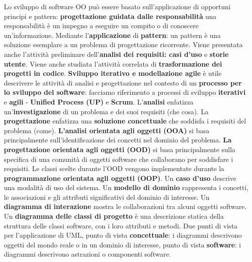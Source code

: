 \documentclass{article}
\numberwithin{equation}{subsection}
\begin{document}
Lo sviluppo di software OO può essere basato sull'applicazione di opportuni principi e pattern: \textbf{progettazione guidata dalle responsabilità} una responsabilità è un impegno a eseguire un compito o di conoscere un'informazione. Mediante l'\textbf{applicazione} di \textbf{pattern}: un pattern è una soluzione esemplare a un problema di progettazione ricorrente. Viene presentata anche l'attività preliminare dell'\textbf{analisi dei requisiti: casi d'uso} e \textbf{storie utente}. Viene anche studiata l'attività correlata di \textbf{trasformazione dei progetti in codice}. \textbf{Sviluppo iterativo e modellazione agile} è utile descrivere le attività di analisi e progettazione nel contesto di un \textbf{processo per lo sviluppo del software}: facciamo riferimento a processi di sviluppo \textbf{iterativi} e \textbf{agili} - \textbf{Unified Process (UP)} e \textbf{Scrum}. L'\textbf{analisi} enfatizza un'\textbf{investigazione} di un problema e dei suoi requisiti (che cosa). La \textbf{progettazione} enfatizza una \textbf{soluzione concettuale} che soddisfa i requisiti del problema (come). \textbf{L'analisi orientata agli oggetti (OOA)} si basa principalmente sull'identificazione dei concetti nel dominio del problema. \textbf{La progettazione orientata agli oggetti (OOD)} si basa principalmente sulla specifica di una comunità  di oggetti software che collaborano per soddisfare i requisiti. Le classi scelte durante l'OOD vengono implementate durante la \textbf{programmazione orientata agli oggetti (OOP)}. Un \textbf{caso d'uso} descrive una modalità di uso del sistema. Un \textbf{modello di dominio} rappresenta i concetti, le associazioni e gli attributi significativi del dominio di interesse. Un \textbf{diagramma di interazione} mostra le collaborazioni tra alcuni oggetti software. Un \textbf{diagramma delle classi di progetto} è una descrizione statica della struttura delle classi software, con i loro attributi e metodi. Due punti di vista per l'applicazione di UML, punto di vista \textbf{concettuale}: i diagrammi descrivono oggetti del mondo reale o in un dominio di interesse, punto di vista \textbf{software}: i diagrammi descrivono astrazioni o componenti software.
\end{document}
